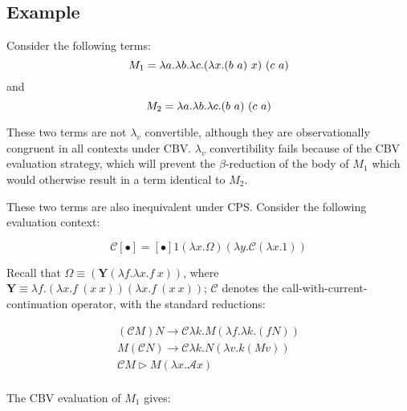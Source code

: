 \documentclass[a4paper,10pt]{article}
\begin{document}
\subsection{Example}
Consider the following terms:\\
\begin{equation}
 M_1 = \lambda a . \lambda b . \lambda c . (\lambda x . (b\ a)\ x)\ (c\ a)\\
\end{equation}
and
\begin{equation}
 M_2 = \lambda a . \lambda b . \lambda c .(b\ a)\ (c\ a)\\
\end{equation}

These two terms are not $\lambda_v$ convertible, although they are observationally congruent in all contexts under CBV.  $\lambda_v$ convertibility fails because of the CBV evaluation strategy, which will prevent the $\beta$-reduction of the body of $M_1$ which would otherwise result in a term identical to $M_2$.

These two terms are also inequivalent under CPS.  Consider the following evaluation context:

\begin{equation}
   \mathcal{C}[\bullet]= [ \bullet ] 1 (\lambda x . \Omega) (\lambda y . 
\mathcal{C}(\lambda x . 1))
\end{equation}

Recall that $\Omega \equiv (\textbf{Y} (\lambda f . \lambda x . f\ x))$, where $\textbf{Y} \equiv
 \lambda f . (\lambda x . f\ (x\ x)) (\lambda x . f\ (x\ x))$; $\mathcal{C}$ denotes the
call-with-current-continuation operator, with the standard reductions:

\begin{eqnarray}
(\mathcal{C} M)N \rightarrow \mathcal{C}\lambda k . M(\lambda f . \lambda k . (f N))\\
%
M(\mathcal{C} N) \rightarrow \mathcal{C} \lambda k . N (\lambda v . k (M v))\\
%
\mathcal{C}M \rhd M (\lambda x. \mathcal{A} x)\\
\end{eqnarray}

The CBV evaluation of $M_1$ gives:\\
\end{document}
